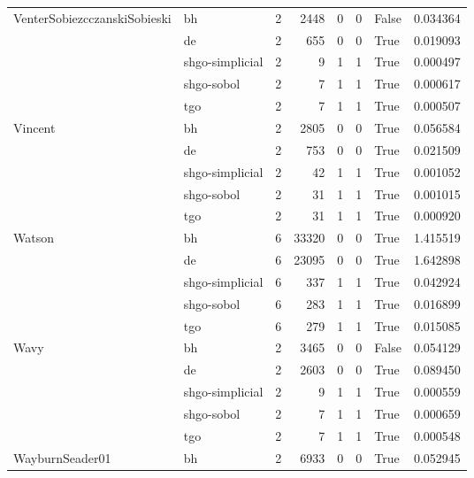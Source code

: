 \begin{longtable}{llrrrrlr}
VenterSobiezcczanskiSobieski & bh &     2 &     2448 &      0 &       0 &   False &    0.034364 \\
         & de &     2 &      655 &      0 &       0 &    True &    0.019093 \\
         & shgo-simplicial &     2 &        9 &      1 &       1 &    True &    0.000497 \\
         & shgo-sobol &     2 &        7 &      1 &       1 &    True &    0.000617 \\
         & tgo &     2 &        7 &      1 &       1 &    True &    0.000507 \\
Vincent & bh &     2 &     2805 &      0 &       0 &    True &    0.056584 \\
         & de &     2 &      753 &      0 &       0 &    True &    0.021509 \\
         & shgo-simplicial &     2 &       42 &      1 &       1 &    True &    0.001052 \\
         & shgo-sobol &     2 &       31 &      1 &       1 &    True &    0.001015 \\
         & tgo &     2 &       31 &      1 &       1 &    True &    0.000920 \\
Watson & bh &     6 &    33320 &      0 &       0 &    True &    1.415519 \\
         & de &     6 &    23095 &      0 &       0 &    True &    1.642898 \\
         & shgo-simplicial &     6 &      337 &      1 &       1 &    True &    0.042924 \\
         & shgo-sobol &     6 &      283 &      1 &       1 &    True &    0.016899 \\
         & tgo &     6 &      279 &      1 &       1 &    True &    0.015085 \\
Wavy & bh &     2 &     3465 &      0 &       0 &   False &    0.054129 \\
         & de &     2 &     2603 &      0 &       0 &    True &    0.089450 \\
         & shgo-simplicial &     2 &        9 &      1 &       1 &    True &    0.000559 \\
         & shgo-sobol &     2 &        7 &      1 &       1 &    True &    0.000659 \\
         & tgo &     2 &        7 &      1 &       1 &    True &    0.000548 \\
WayburnSeader01 & bh &     2 &     6933 &      0 &       0 &    True &    0.052945 \\

\end{longtable}
